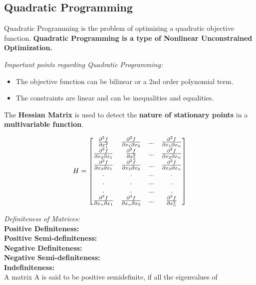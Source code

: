 \documentclass[12pt, letterpaper]{article}
\begin{document}
\subsection{Quadratic Programming}
Quadratic Programming is the problem of optimizing a quadratic objective function.
\textbf{Quadratic Programming is a type of Nonlinear Unconstrained Optimization.}

\emph{Important points regarding Quadratic Programming:}
\begin{itemize}
    \item The objective function can be bilinear or a 2nd order polynomial term.
    \item The constraints are linear and can be inequalities and equalities.
\end{itemize}

The \textbf{Hessian Matrix} is used to detect the \textbf{nature of stationary points} in a \textbf{multivariable function}.

\begin{equation}
H =
\begin{bmatrix}
\pdv[2]{f}{x_1} & \pdv{f}{x_1}{x_2} & ... & \pdv{f}{x_1}{x_n}\\
\pdv{f}{x_2}{x_1} & \pdv[2]{f}{x_2} & ... & \pdv{f}{x_2}{x_n}\\
\pdv{f}{x_3}{x_1} & \pdv{f}{x_3}{x_2} & ... & \pdv{f}{x_3}{x_n}\\
. & . & ... & .\\
. & . & ... & .\\
. & . & ... & .\\
\pdv{f}{x_n}{x_1} & \pdv{f}{x_n}{x_2} & ... & \pdv[2]{f}{x_n}\\
\end{bmatrix}
\end{equation}

\emph{Definiteness of Matrices:} \\
\textbf{Positive Definiteness:} \\ 
\textbf{Positive Semi-definiteness:}  \\
\textbf{Negative Definiteness: }  \\
\textbf{Negative Semi-definiteness:}  \\
\textbf{Indefiniteness:}  \\

A matrix A is said to be positive semidefinite, if all the eigenvalues of 
\end{document}
